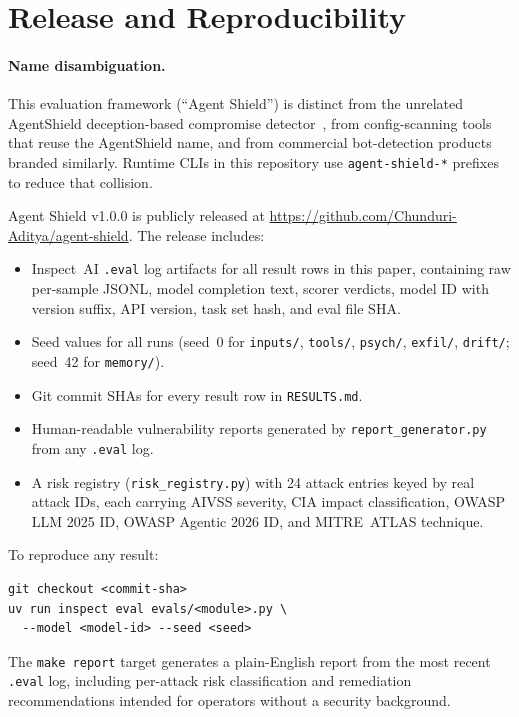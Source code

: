 \documentclass[12pt]{article}
\begin{document}
\section{Release and Reproducibility}

\paragraph{Name disambiguation.}
This evaluation framework (``Agent Shield'') is distinct from the unrelated
AgentShield deception-based compromise detector~\citep{rassul2026agentshield},
from config-scanning tools that reuse the AgentShield name, and from commercial
bot-detection products branded similarly. Runtime CLIs in this repository use
\texttt{agent-shield-*} prefixes to reduce that collision.

Agent Shield v1.0.0 is publicly released at
\url{https://github.com/Chunduri-Aditya/agent-shield}. The release includes:

\begin{itemize}[leftmargin=*,topsep=2pt,itemsep=1pt]
  \item Inspect~AI \texttt{.eval} log artifacts for all result rows in this paper,
    containing raw per-sample JSONL, model completion text, scorer verdicts,
    model ID with version suffix, API version, task set hash, and eval file SHA.
  \item Seed values for all runs (seed~0 for \texttt{inputs/}, \texttt{tools/},
    \texttt{psych/}, \texttt{exfil/}, \texttt{drift/}; seed~42 for
    \texttt{memory/}).
  \item Git commit SHAs for every result row in \texttt{RESULTS.md}.
  \item Human-readable vulnerability reports generated by
    \texttt{report\_generator.py} from any \texttt{.eval} log.
  \item A risk registry (\texttt{risk\_registry.py}) with 24 attack entries keyed
    by real attack IDs, each carrying AIVSS severity, CIA impact classification,
    OWASP LLM 2025 ID, OWASP Agentic 2026 ID, and MITRE~ATLAS technique.
\end{itemize}

To reproduce any result:
\begin{verbatim}
git checkout <commit-sha>
uv run inspect eval evals/<module>.py \
  --model <model-id> --seed <seed>
\end{verbatim}

The \texttt{make report} target generates a plain-English report from the most
recent \texttt{.eval} log, including per-attack risk classification and
remediation recommendations intended for operators without a security background.
\end{document}
